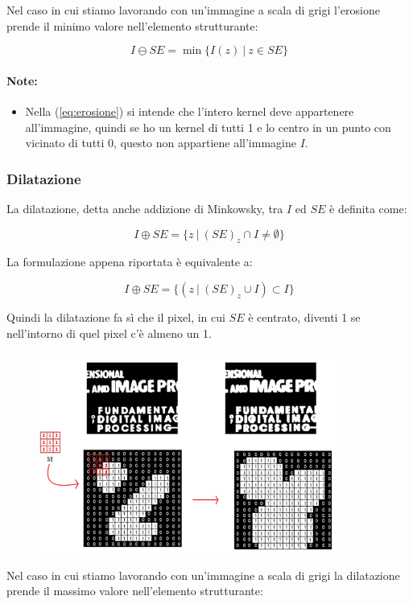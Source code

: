 Nel caso in cui stiamo lavorando con un'immagine a scala di grigi l'erosione prende il minimo valore nell'elemento strutturante:

$$
    I \ominus SE = \min\{I(z) \ | \ z \in SE\}
$$


\paragraph{Note:}
\begin{itemize}
    \item Nella (\ref{eq:erosione}) si intende che l'intero kernel deve appartenere all'immagine, quindi se ho un kernel di tutti 1 e lo centro in un punto con vicinato di tutti 0, questo non appartiene all'immagine $I$.
\end{itemize}

\subsubsection{Dilatazione}

La dilatazione, detta anche addizione di Minkowsky, tra $I$ ed $SE$ è
definita come:

$$
    I \oplus SE = \{z \ | \ (SE)_z \cap I \neq \emptyset\}
$$

La formulazione appena riportata è equivalente a:

$$
    I \oplus SE = \{(z \ | \ (SE)_z \cup I) \subset I\}
$$

Quindi la dilatazione fa sì
che il pixel, in cui $SE$ è centrato, diventi 1 se nell'intorno di quel pixel
c'è almeno un 1.

\begin{figure}[H]
    \centering
    \includegraphics[width=10cm, keepaspectratio]{capitoli/immagini/imgs/dilatazione-esempio.png}
\end{figure}

Nel caso in cui stiamo lavorando con un'immagine a scala di grigi
la dilatazione prende il massimo valore nell'elemento strutturante:

